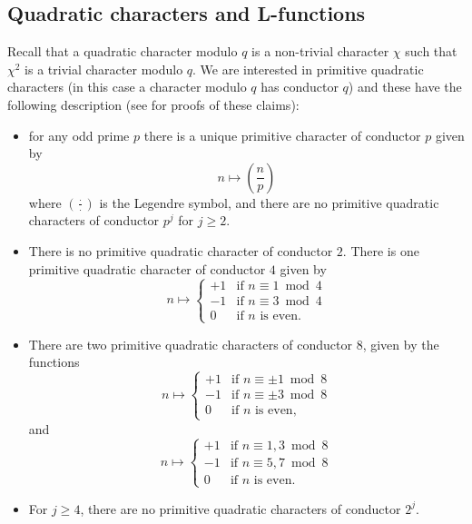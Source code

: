 \documentclass[12pt]{amsart}
\begin{document}
	\subsection{Quadratic characters and L-functions}
	\label{subsec:quadratic_char}
	
	Recall that a quadratic character modulo $q$ is a non-trivial character $\chi$ such that $\chi^2$ is a trivial character modulo $q$. We are interested in primitive quadratic characters (in this case a character modulo $q$ has conductor $q$) and these have the following description (see \cite[Ch. 9]{MV} for proofs of these claims): 
	\begin{itemize}
		\item for any odd prime $p$ there is a unique primitive character of conductor $p$ given by 
		\begin{equation}
			\label{eq:quadchar1}
			n \mapsto \left( \frac n p \right)
		\end{equation}
		where $( \tfrac \cdot \cdot )$ is the Legendre symbol, and there are no primitive quadratic characters of conductor $p^j$ for $j \geq 2$.
		
		\item There is no primitive quadratic character of conductor $2$. There is one primitive quadratic character of conductor $4$ given by
		\begin{equation}
			\label{eq:quadchar2}
			n \mapsto 
			\begin{cases} 
				+1 & \mbox{if $n\equiv 1 \bmod 4$}\\
				-1 & \mbox{if $n\equiv 3 \bmod 4$}\\
				0 & \mbox{if $n$ is even.}
			\end{cases}
		\end{equation}
		
		\item There are two primitive quadratic characters of conductor $8$, given by the functions
		\begin{equation}
			\label{eq:quadchar3}
			n \mapsto 
			\begin{cases} 
				+1 & \mbox{if $n\equiv \pm 1 \bmod 8$}\\
				-1 & \mbox{if $n\equiv \pm 3 \bmod 8$}\\
				0 & \mbox{if $n$ is even,}
			\end{cases}
		\end{equation}
		and
		\begin{equation}
			\label{eq:quadchar4}
			n \mapsto 
			\begin{cases} 
				+1 & \mbox{if $n\equiv 1,3 \bmod 8$}\\
				-1 & \mbox{if $n\equiv 5,7 \bmod 8$}\\
				0 & \mbox{if $n$ is even.}
			\end{cases}
		\end{equation}
		\item For $j \geq 4$, there are no primitive quadratic characters of conductor $2^j$.
	\end{itemize}
	
\end{document}
